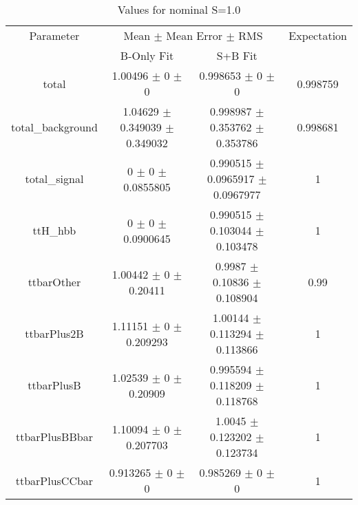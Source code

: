 \begin{table}
\centering
\caption{Values for nominal S=1.0}
\begin{tabular}{cccc}
\toprule
Parameter & \multicolumn{2}{c}{Mean $\pm$ Mean Error $\pm$ RMS} & Expectation\\
 & B-Only Fit & S+B Fit & \\
\midrule
total & \num{1.00496} $\pm$ \num{0} $\pm$ \num{0} & \num{0.998653} $\pm$ \num{0} $\pm$ \num{0} & \num{0.998759}\\
total\_background & \num{1.04629} $\pm$ \num{0.349039} $\pm$ \num{0.349032} & \num{0.998987} $\pm$ \num{0.353762} $\pm$ \num{0.353786} & \num{0.998681}\\
total\_signal & \num{0} $\pm$ \num{0} $\pm$ \num{0.0855805} & \num{0.990515} $\pm$ \num{0.0965917} $\pm$ \num{0.0967977} & \num{1}\\
ttH\_hbb & \num{0} $\pm$ \num{0} $\pm$ \num{0.0900645} & \num{0.990515} $\pm$ \num{0.103044} $\pm$ \num{0.103478} & \num{1}\\
ttbarOther & \num{1.00442} $\pm$ \num{0} $\pm$ \num{0.20411} & \num{0.9987} $\pm$ \num{0.10836} $\pm$ \num{0.108904} & \num{0.99}\\
ttbarPlus2B & \num{1.11151} $\pm$ \num{0} $\pm$ \num{0.209293} & \num{1.00144} $\pm$ \num{0.113294} $\pm$ \num{0.113866} & \num{1}\\
ttbarPlusB & \num{1.02539} $\pm$ \num{0} $\pm$ \num{0.20909} & \num{0.995594} $\pm$ \num{0.118209} $\pm$ \num{0.118768} & \num{1}\\
ttbarPlusBBbar & \num{1.10094} $\pm$ \num{0} $\pm$ \num{0.207703} & \num{1.0045} $\pm$ \num{0.123202} $\pm$ \num{0.123734} & \num{1}\\
ttbarPlusCCbar & \num{0.913265} $\pm$ \num{0} $\pm$ \num{0} & \num{0.985269} $\pm$ \num{0} $\pm$ \num{0} & \num{1}\\
\bottomrule
\end{tabular}
\end{table}